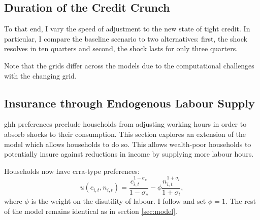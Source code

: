 \documentclass[12pt]{article} %
\numberwithin{equation}{section} %
\numberwithin{figure}{section}
\numberwithin{table}{section}
\begin{document}
\subsection{Duration of the Credit Crunch}
\label{sec:sensitivity-persistence}


To that end, I vary the speed of adjustment to the new state of tight credit. In particular, I compare the baseline scenario to two alternatives: first, the shock resolves in ten quarters and second, the shock lasts for only three quarters.

Note that the grids differ across the models due to the computational challenges with the changing grid. 

\subsection{Insurance through Endogenous Labour Supply}
\label{sec:sensitivity-end-labour}

\Gls{ghh} preferences preclude households from adjusting working hours in order to absorb shocks to their consumption. This section explores an extension of the model which allows households to do so. This allows wealth-poor households to potentially insure against reductions in income by supplying more labour hours.

Households now have \Gls{crra}-type preferences:
\begin{equation}
    u(c_{i,t}, n_{i,t}) = \frac{c_{i,t}^{1-\sigma_c}}{1-\sigma_c} - \phi \frac{n_{i,t}^{1+\sigma_l}}{1+\sigma_l}, \label{eq:hh-crra-utility}
\end{equation}
where $\phi$ is the weight on the disutility of labour. I follow \textcite{mckay2016} and set $\phi=1$. The rest of the model remains identical as in section \ref{sec:model}.


\end{document}
